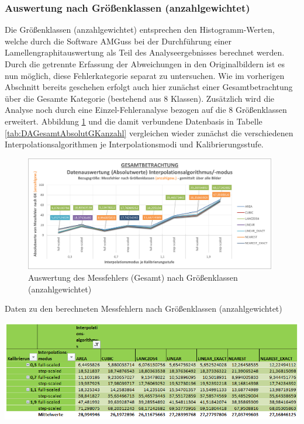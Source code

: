 \documentclass[
fontsize=10pt, 
listof = totoc,
parskip = half	
]{report}
\begin{document}
\subsubsection{Auswertung nach Größenklassen (anzahlgewichtet)}
\label{subsubsec:AuswertungGKanz}
Die Größenklassen (anzahlgewichtet) entsprechen den Histogramm-Werten, welche durch die Software AMGuss bei der Durchführung einer Lamellengraphitauswertung als Teil des Analyseergebnisses berechnet werden. Durch die getrennte Erfassung der Abweichungen in den Originalbildern ist es nun möglich, diese Fehlerkategorie separat zu untersuchen. Wie im vorherigen Abschnitt bereits geschehen erfolgt auch hier zunächst einer Gesamtbetrachtung über die Gesamte Kategorie (bestehend aus 8 Klassen). Zusätzlich wird die Analyse noch durch eine Einzel-Fehleranalyse bezogen auf die 8 Größenklassen erweitert. Abbildung \ref{fig:DAGesamtAbsolutGKanzahl} und die damit verbundene Datenbasis in Tabelle \ref{tab:DAGesamtAbsolutGKanzahl} vergleichen wieder zunächst die verschiedenen Interpolationsalgorithmen je Interpolationsmodi und Kalibrierungsstufe.

\begin{figure}[H]
	\centering
	\includegraphics[width=11cm, height=\textheight, keepaspectratio]{pics/DA_Gesamt_Absolut_GKanzahl}
	\caption{Auswertung des Messfehlers (Gesamt) nach Größenklassen (anzahlgewichtet)}
	\label{fig:DAGesamtAbsolutGKanzahl}
\end{figure}

\begin{table}[H]
	\centering
	\caption{Daten zu den berechneten Messfehlern nach Größenklassen (anzahlgewichtet)}
	\label{tab:DAGesamtAbsolutGKanzahl}
	\includegraphics[width=\textwidth, height=\textheight, keepaspectratio]{pics/Tab_DA_Gesamt_Absolut_GKanzahl}
\end{table}
\end{document}
